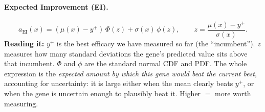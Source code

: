 \documentclass[11pt]{article}
\begin{document}
\paragraph{Expected Improvement (EI).}
\begin{equation}
a_{\mathrm{EI}}(x)=(\mu(x)-y^+)\,\Phi(z)+\sigma(x)\,\phi(z),\qquad z=\frac{\mu(x)-y^+}{\sigma(x)} .
\end{equation}
\textbf{Reading it:} $y^+$ is the best efficacy we have measured so far (the ``incumbent'').
$z$ measures how many standard deviations the gene's predicted value sits above that
incumbent. $\Phi$ and $\phi$ are the standard normal CDF and PDF. The whole expression is
the \emph{expected amount by which this gene would beat the current best}, accounting for
uncertainty: it is large either when the mean clearly beats $y^+$, or when the gene is
uncertain enough to plausibly beat it. Higher $=$ more worth measuring.
\end{document}
